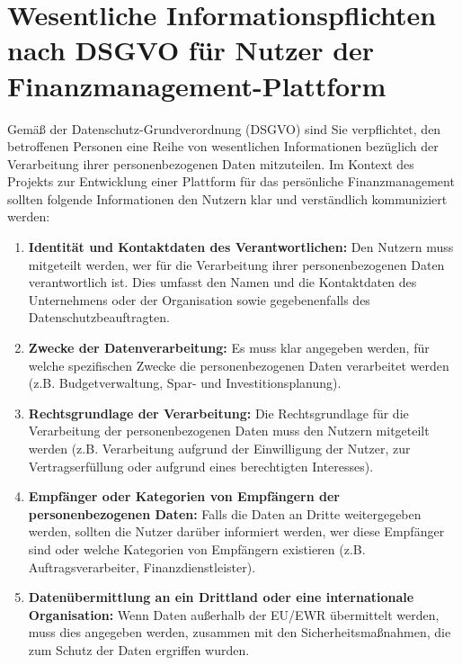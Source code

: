 \chapter{Wesentliche Informationspflichten nach DSGVO für Nutzer der Finanzmanagement-Plattform}

Gemäß der Datenschutz-Grundverordnung (DSGVO) sind Sie verpflichtet, den betroffenen Personen eine Reihe von wesentlichen Informationen bezüglich der Verarbeitung ihrer personenbezogenen Daten mitzuteilen. Im Kontext des Projekts zur Entwicklung einer Plattform für das persönliche Finanzmanagement sollten folgende Informationen den Nutzern klar und verständlich kommuniziert werden:

\begin{enumerate}

    \item \textbf{Identität und Kontaktdaten des Verantwortlichen:}
        Den Nutzern muss mitgeteilt werden, wer für die Verarbeitung ihrer personenbezogenen Daten verantwortlich ist. Dies umfasst den Namen und die Kontaktdaten des Unternehmens oder der Organisation sowie gegebenenfalls des Datenschutzbeauftragten.

    \item \textbf{Zwecke der Datenverarbeitung:}
        Es muss klar angegeben werden, für welche spezifischen Zwecke die personenbezogenen Daten verarbeitet werden (z.B. Budgetverwaltung, Spar- und Investitionsplanung).

    \item \textbf{Rechtsgrundlage der Verarbeitung:}
        Die Rechtsgrundlage für die Verarbeitung der personenbezogenen Daten muss den Nutzern mitgeteilt werden (z.B. Verarbeitung aufgrund der Einwilligung der Nutzer, zur Vertragserfüllung oder aufgrund eines berechtigten Interesses).

    \item \textbf{Empfänger oder Kategorien von Empfängern der personenbezogenen Daten:} 
        Falls die Daten an Dritte weitergegeben werden, sollten die Nutzer darüber informiert werden, wer diese Empfänger sind oder welche Kategorien von Empfängern existieren (z.B. Auftragsverarbeiter, Finanzdienstleister).

    \item \textbf{Datenübermittlung an ein Drittland oder eine internationale Organisation:} 
        Wenn Daten außerhalb der EU/EWR übermittelt werden, muss dies angegeben werden, zusammen mit den Sicherheitsmaßnahmen, die zum Schutz der Daten ergriffen wurden.


\end{enumerate}
